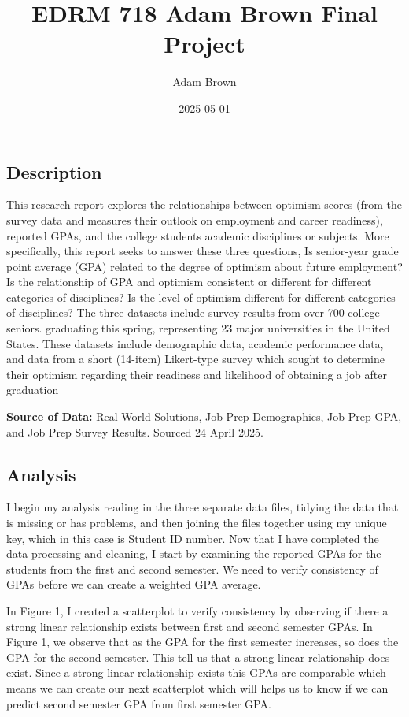 \documentclass[
  letterpaper,
  DIV=11,
  numbers=noendperiod]{scrartcl}
\title{EDRM 718 Adam Brown Final Project}
\author{Adam Brown}
\date{2025-05-01}
\begin{document}
\maketitle


\subsection{Description}\label{description}

This research report explores the relationships between optimism scores
(from the survey data and measures their outlook on employment and
career readiness), reported GPAs, and the college students academic
disciplines or subjects. More specifically, this report seeks to answer
these three questions, Is senior-year grade point average (GPA) related
to the degree of optimism about future employment? Is the relationship
of GPA and optimism consistent or different for different categories of
disciplines? Is the level of optimism different for different categories
of disciplines? The three datasets include survey results from over 700
college seniors. graduating this spring, representing 23 major
universities in the United States. These datasets include demographic
data, academic performance data, and data from a short (14-item)
Likert-type survey which sought to determine their optimism regarding
their readiness and likelihood of obtaining a job after graduation

\textbf{Source of Data:} Real World Solutions, Job Prep Demographics,
Job Prep GPA, and Job Prep Survey Results. Sourced 24 April 2025.

\subsection{Analysis}\label{analysis}

I begin my analysis reading in the three separate data files, tidying
the data that is missing or has problems, and then joining the files
together using my unique key, which in this case is Student ID number.
Now that I have completed the data processing and cleaning, I start by
examining the reported GPAs for the students from the first and second
semester. We need to verify consistency of GPAs before we can create a
weighted GPA average.

In Figure 1, I created a scatterplot to verify consistency by observing
if there a strong linear relationship exists between first and second
semester GPAs. In Figure 1, we observe that as the GPA for the first
semester increases, so does the GPA for the second semester. This tell
us that a strong linear relationship does exist. Since a strong linear
relationship exists this GPAs are comparable which means we can create
our next scatterplot which will helps us to know if we can predict
second semester GPA from first semester GPA.
\end{document}
